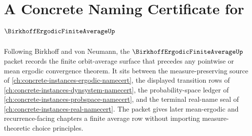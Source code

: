 \chapter{A Concrete Naming Certificate for $\BirkhoffErgodicFiniteAverageUp$}
\label{ch:concrete-instances-birkhoff-ergodic-finite-average-namecert}

Following Birkhoff and von Neumann, the $\BirkhoffErgodicFiniteAverageUp$ packet records the finite orbit-average surface that precedes any pointwise or mean ergodic convergence theorem. It sits between the measure-preserving source of \autoref{ch:concrete-instances-ergodic-namecert}, the displayed transition rows of \autoref{ch:concrete-instances-dynsystem-namecert}, the probability-space ledger of \autoref{ch:concrete-instances-probspace-namecert}, and the terminal real-name seal of \autoref{ch:concrete-instances-real-namecert}. The packet gives later mean-ergodic and recurrence-facing chapters a finite average row without importing measure-theoretic choice principles.

